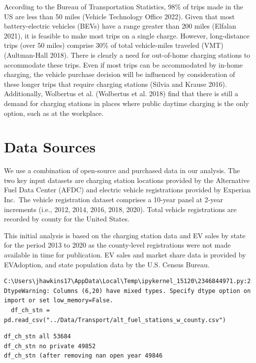 \documentclass[
  letterpaper,
  DIV=11,
  numbers=noendperiod]{scrartcl}
\begin{document}
According to the Bureau of Transportation Statistics, 98\% of trips made
in the US are less than 50 miles (Vehicle Technology Office 2022). Given
that most battery-electric vehicles (BEVs) have a range greater than 200
miles (Elfalan 2021), it is feasible to make most trips on a single
charge. However, long-distance trips (over 50 miles) comprise 30\% of
total vehicle-miles traveled (VMT) (Aultman-Hall 2018). There is clearly
a need for out-of-home charging stations to accommodate these trips.
Even if most trips can be accommodated by in-home charging, the vehicle
purchase decision will be influenced by consideration of these longer
trips that require charging stations (Silvia and Krause 2016).
Additionally, Wolbertus et al. (Wolbertus et al. 2018) find that there
is still a demand for charging stations in places where public daytime
charging is the only option, such as at the workplace.

\hypertarget{data-sources}{%
\section{Data Sources}\label{data-sources}}

We use a combination of open-source and purchased data in our analysis.
The two key input datasets are charging station locations provided by
the Alternative Fuel Data Center (AFDC) and electric vehicle
registrations provided by Experian Inc.~The vehicle registration dataset
comprises a 10-year panel at 2-year increments (i.e., 2012, 2014, 2016,
2018, 2020). Total vehicle registrations are recorded by county for the
United States.

This initial analysis is based on the charging station data and EV sales
by state for the period 2013 to 2020 as the county-level registrations
were not made available in time for publication. EV sales and market
share data is provided by EVAdoption, and state population data by the
U.S. Census Bureau.

\begin{verbatim}
C:\Users\jhawkins17\AppData\Local\Temp\ipykernel_15120\2346844971.py:2: DtypeWarning: Columns (6,20) have mixed types. Specify dtype option on import or set low_memory=False.
  df_ch_stn = pd.read_csv("../Data/Transport/alt_fuel_stations_w_county.csv")
\end{verbatim}

\begin{verbatim}
df_ch_stn all 53684
df_ch_stn no private 49852
df_ch_stn (after removing nan open year 49846
\end{verbatim}
\end{document}
